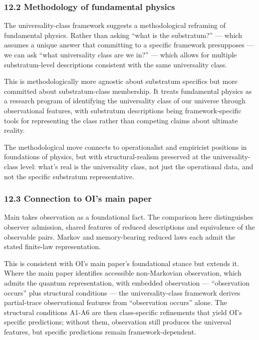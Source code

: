 \documentclass[
]{article}
\begin{document}
\hypertarget{methodology-of-fundamental-physics}{%
\subsubsection{12.2 Methodology of fundamental
physics}\label{methodology-of-fundamental-physics}}

The universality-class framework suggests a methodological reframing of
fundamental physics. Rather than asking ``what is the substratum?'' ---
which assumes a unique answer that committing to a specific framework
presupposes --- we can ask ``what universality class are we in?'' ---
which allows for multiple substratum-level descriptions consistent with
the same universality class.

This is methodologically more agnostic about substratum specifics but
more committed about substratum-class membership. It treats fundamental
physics as a research program of identifying the universality class of
our universe through observational features, with substratum
descriptions being framework-specific tools for representing the class
rather than competing claims about ultimate reality.

The methodological move connects to operationalist and empiricist
positions in foundations of physics, but with structural-realism
preserved at the universality-class level: what's real is the
universality class, not just the operational data, and not the specific
substratum representative.

\hypertarget{connection-to-ois-main-paper}{%
\subsubsection{12.3 Connection to OI's main
paper}\label{connection-to-ois-main-paper}}

Main takes observation as a foundational fact. The comparison here
distinguishes observer admission, shared features of reduced
descriptions and equivalence of the observable pairs. Markov and
memory-bearing reduced laws each admit the stated finite-law
representation.

This is consistent with OI's main paper's foundational stance but
extends it. Where the main paper identifies accessible non-Markovian
observation, which admits the quantum representation, with embedded
observation --- ``observation occurs'' plus structural conditions ---
the universality-class framework derives partial-trace observational
features from ``observation occurs'' alone. The structural conditions
A1-A6 are then class-specific refinements that yield OI's specific
predictions; without them, observation still produces the universal
features, but specific predictions remain framework-dependent.
\end{document}
